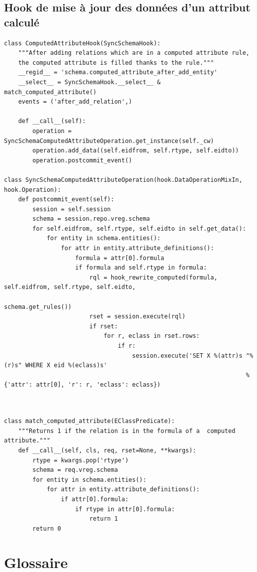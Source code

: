 \documentclass {report}
\begin{document}
\section{Hook de mise à jour des données d'un attribut calculé}
\renewcommand{\lstlistingname}{Hook}
\begin{lstlisting}[caption= Mise à jour des données d'un attribut calculé]
class ComputedAttributeHook(SyncSchemaHook):
	"""After adding relations which are in a computed attribute rule,
	the computed attribute is filled thanks to the rule."""
	__regid__ = 'schema.computed_attribute_after_add_entity'
	__select__ = SyncSchemaHook.__select__ & match_computed_attribute()
	events = ('after_add_relation',)

	def __call__(self):
		operation = SyncSchemaComputedAttributeOperation.get_instance(self._cw)
		operation.add_data((self.eidfrom, self.rtype, self.eidto))
		operation.postcommit_event()

class SyncSchemaComputedAttributeOperation(hook.DataOperationMixIn, hook.Operation):
	def postcommit_event(self):
		session = self.session
		schema = session.repo.vreg.schema
		for self.eidfrom, self.rtype, self.eidto in self.get_data():
			for entity in schema.entities():
				for attr in entity.attribute_definitions():
					formula = attr[0].formula
					if formula and self.rtype in formula:
						rql = hook_rewrite_computed(formula, self.eidfrom, self.rtype, self.eidto, 
																				schema.get_rules())
						rset = session.execute(rql)
						if rset:
							for r, eclass in rset.rows:
								if r:
									session.execute('SET X %(attr)s "%(r)s" WHERE X eid %(eclass)s'
																	% {'attr': attr[0], 'r': r, 'eclass': eclass})
																	
		
\end{lstlisting}

\begin{lstlisting}[caption= Sélecteur]
class match_computed_attribute(EClassPredicate):
	"""Returns 1 if the relation is in the formula of a  computed attribute."""
	def __call__(self, cls, req, rset=None, **kwargs):
		rtype = kwargs.pop('rtype')
		schema = req.vreg.schema
		for entity in schema.entities():
			for attr in entity.attribute_definitions():
				if attr[0].formula:
					if rtype in attr[0].formula:
						return 1           
		return 0
\end{lstlisting}



\chapter{Glossaire}
\end{document}
